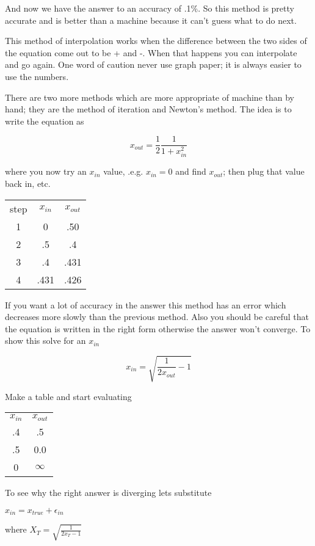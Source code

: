 \documentclass[a4paper,10pt]{article}
\begin{document}
And now we have the answer to an accuracy of .1\%. So this method is pretty accurate and is better than a machine because
it can't guess what to do next.

This method of interpolation works when the difference between the two sides of the equation come out to be + and -. 
When that happens you can interpolate and go again.  One word of caution never use graph paper; it is always easier to use the
numbers.

There are two more methods which are more appropriate of machine than by hand; they are the method of iteration and Newton's method.
The idea is to write the equation as
\begin{center}
 $$x_{out}=\frac{1}{2}\frac{1}{1+x^2_{in}}$$
\end{center}

where you now try an $x_{in}$ value, .e.g. $x_{in}=0$ and find $x_{out}$; then plug that value back in, etc.

\begin{tabular}{c c c}
step & $x_{in}$ & $x_{out}$\\
1 & 0 & .50\\
2 & .5 & .4\\
3 & .4 & .431\\
4 & .431 & .426
\end{tabular}

If you want a lot of accuracy in the answer this method has an error which decreases more slowly than the previous method. 
Also you should be careful that the equation is written in the right form otherwise the answer won't converge. To show this solve
for an $x_{in}$ 
\begin{center}
 $$x_{in}=\sqrt{\frac{1}{2x_{out}}-1}$$
\end{center}

Make a table and start evaluating
\begin{center}
\begin{tabular}{c c}
$x_{in}$ & $x_{out}$\\
.4 & .5\\
.5 & 0.0\\
0 & $\infty$

\end{tabular}
\end{center}

To see why the right answer is diverging lets substitute \begin{center}$x_{in}=x_{true}+\epsilon_{in}$\end{center}
where $X_T=\sqrt{\frac{1}{2x_T-1}}$
\end{document}
